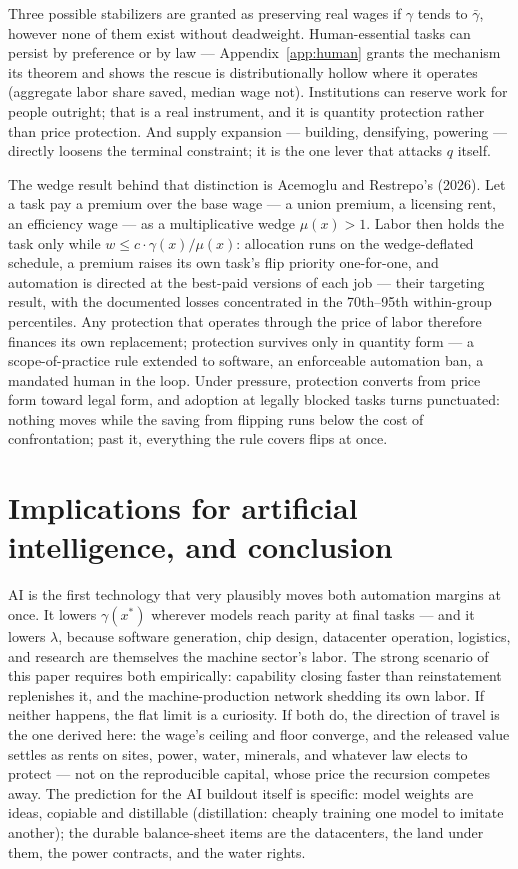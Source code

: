 \documentclass[12pt]{article}
\theoremstyle{plain}
\begin{document}
Three possible stabilizers are granted as preserving real wages if $\gamma$ tends to $\bar{\gamma}$, however none of them exist without deadweight. Human-essential tasks can persist by preference or by law --- Appendix~\ref{app:human} grants the mechanism its theorem and shows the rescue is distributionally hollow where it operates (aggregate labor share saved, median wage not). Institutions can reserve work for people outright; that is a real instrument, and it is quantity protection rather than price protection. And supply expansion --- building, densifying, powering --- directly loosens the terminal constraint; it is the one lever that attacks $q$ itself.

The wedge result behind that distinction is Acemoglu and Restrepo's (2026). Let a task pay a premium over the base wage --- a union premium, a licensing rent, an efficiency wage --- as a multiplicative wedge $\mu (x) > 1$. Labor then holds the task only while $w \le c\cdot \gamma (x)/\mu (x)$: allocation runs on the wedge-deflated schedule, a premium raises its own task's flip priority one-for-one, and automation is directed at the best-paid versions of each job --- their targeting result, with the documented losses concentrated in the 70th--95th within-group percentiles. Any protection that operates through the price of labor therefore finances its own replacement; protection survives only in quantity form --- a scope-of-practice rule extended to software, an enforceable automation ban, a mandated human in the loop. Under pressure, protection converts from price form toward legal form, and adoption at legally blocked tasks turns punctuated: nothing moves while the saving from flipping runs below the cost of confrontation; past it, everything the rule covers flips at once.

\section{Implications for artificial intelligence, and conclusion}\label{sec:ai}

AI is the first technology that very plausibly moves both automation margins at once. It lowers $\gamma (x^*)$ wherever models reach parity at final tasks --- and it lowers $\lambda$, because software generation, chip design, datacenter operation, logistics, and research are themselves the machine sector's labor. The strong scenario of this paper requires both empirically: capability closing faster than reinstatement replenishes it, and the machine-production network shedding its own labor. If neither happens, the flat limit is a curiosity. If both do, the direction of travel is the one derived here: the wage's ceiling and floor converge, and the released value settles as rents on sites, power, water, minerals, and whatever law elects to protect --- not on the reproducible capital, whose price the recursion competes away. The prediction for the AI buildout itself is specific: model weights are ideas, copiable and distillable (distillation: cheaply training one model to imitate another); the durable balance-sheet items are the datacenters, the land under them, the power contracts, and the water rights.
\end{document}
